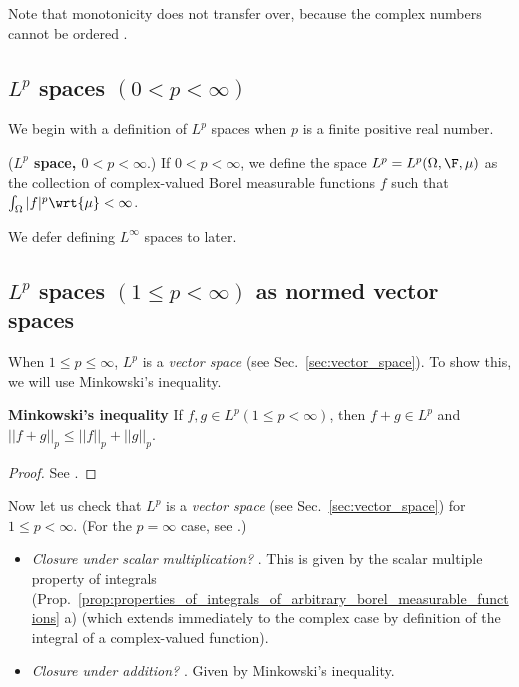 \documentclass{article} %
\newcommand{\dmu}{\wrt{\mu}}
\begin{document}
Note that monotonicity does not transfer over, because the complex numbers cannot be ordered \cite[Sec~1.8]{stewart2018complex}. 

\subsection{$L^p$ spaces  $(0<p<\infty)$}

We begin with a definition of $L^p$ spaces when $p$ is a finite positive real number.   

\begin{definition}{(\textbf{$L^p$ space, $0<p<\infty$}.)} If $0<p<\infty$, we define the space $L^p = L^p(\Omega, \F, \mu)$ as the collection of complex-valued Borel measurable functions $f$ such that $\int_\Omega |f|^p \dmu < \infty$.
\end{definition}

We defer defining $L^\infty$ spaces to later.

\subsection{$L^p$ spaces $(1\leq p<\infty)$ as normed vector spaces}

When $1 \leq p \leq \infty$, $L^p$ is a \textit{vector space} (see Sec.~\ref{sec:vector_space}).   To show this, we will use Minkowski's inequality.
\begin{theorem}{\textbf{Minkowski's inequality}}
If $f,g \in L^p (1 \leq p < \infty)$, then $f+g \in L^p$ and $|| f+g ||_p \leq ||f||_p + ||g||_p$.
\end{theorem}

\begin{proof}	
See \cite[pp.86]{ash2000probability}.
\end{proof} 


Now let us check that $L^p$ is a \textit{vector space} (see Sec.~\ref{sec:vector_space}) for $1 \leq p <\infty$. (For the $p=\infty$ case, see \cite[pp.93]{ash2000probability}.)
\begin{itemize}
\item \textit{Closure under scalar multiplication?}  \greencheck.  This is given by the scalar multiple property of integrals (Prop.~\ref{prop:properties_of_integrals_of_arbitrary_borel_measurable_functions} a)  {\tiny (which extends immediately to the complex case by definition of the integral of a complex-valued function)}. 
\item \textit{Closure under addition?} \greencheck.  Given by Minkowski's inequality.  	
\end{itemize}
\end{document}
